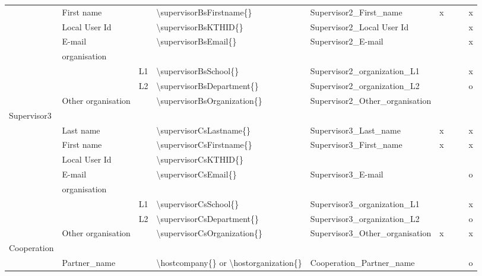 \documentclass[12pt, twoside]{article}
\begin{document}
\begin{landscape}
{\begin{longtable}{L{2cm}|L{4cm}|l|L{4cm}|L{4cm}|l l l l|}
 & First name &  & \textbackslash supervisorBsFirstname\{\} & Supervisor2\_First\_name & x &  &  & x \\
 & Local User Id &  & \textbackslash supervisorBsKTHID\{\} & Supervisor2\_Local User Id &  &  &  & x \\
 & E-mail &  & \textbackslash supervisorBsEmail\{\} & Supervisor2\_E-mail &  &  &  & x \\
 & organisation & \\
 &  & L1 & \textbackslash supervisorBsSchool\{\} & Supervisor2\_organization\_L1 &  &  &  & x \\
 &  & L2 & \textbackslash supervisorBsDepartment\{\} & Supervisor2\_organization\_L2 &  &  &  & o \\
 & Other organisation &  & \textbackslash supervisorBsOrganization\{\} & Supervisor2\_Other\_organisation &  &  &  & \\
Supervisor3 &  \\
 & Last name &  & \textbackslash supervisorCsLastname\{\} & Supervisor3\_Last\_name & x &  &  & x \\
 & First name &  & \textbackslash supervisorCsFirstname\{\} & Supervisor3\_First\_name & x &  &  & x \\
 & Local User Id &  & \textbackslash supervisorCsKTHID\{\} &  &  &  &  & \\ 
 & E-mail &  & \textbackslash supervisorCsEmail\{\} & Supervisor3\_E-mail &  &  &  & o \\
 & organisation & \\ 
 &  & L1 & \textbackslash supervisorCsSchool\{\} & Supervisor3\_organization\_L1 &  &  &  & x \\
 &  & L2 & \textbackslash supervisorCsDepartment\{\} & Supervisor3\_organization\_L2 &  &  &  & o \\
 & Other organisation &  & \textbackslash supervisorCsOrganization\{\} & Supervisor3\_Other\_organisation & x &  &  &  x \\
 \hline
{}Cooperation & \\
 & Partner\_name &  & \textbackslash hostcompany\{\}        or \textbackslash hostorganization\{\} & Cooperation\_Partner\_name &  &  &  & o \\

\end{longtable}}
\end{landscape}
\end{document}
